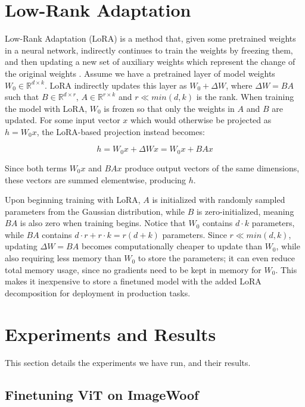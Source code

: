 \documentclass[10pt]{article}
\begin{document}
\section{Low-Rank Adaptation}
\label{sec:lora}

Low-Rank Adaptation (LoRA) is a method that, given some pretrained weights in a neural network, indirectly continues to train the weights by freezing them, and then updating a new set of auxiliary weights which represent the change of the original weights \cite{hu2021loralowrankadaptationlarge}. Assume we have a pretrained layer of model weights $W_0 \in \mathbb{R}^{d \times k}$. LoRA indirectly updates this layer as $W_0 + \Delta W$, where $\Delta W = BA$ such that $B \in \mathbb{R}^{d \times r}$, $A \in \mathbb{R}^{r \times k}$ and $r \ll min(d, k)$ is the rank. When training the model with LoRA, $W_0$ is frozen so that only the weights in $A$ and $B$ are updated. For some input vector $x$ which would otherwise be projected as $h = W_0x$, the LoRA-based projection instead becomes:

\begin{equation}
    h = W_0x + \Delta Wx = W_0x + BAx
\end{equation}

Since both terms $W_0x$ and $BAx$ produce output vectors of the same dimensions, these vectors are summed elementwise, producing $h$.

Upon beginning training with LoRA, $A$ is initialized with randomly sampled parameters from the Gaussian distribution, while $B$ is zero-initialized, meaning $BA$ is also zero when training begins. Notice that $W_0$ contains $d \cdot k$ parameters, while $BA$ contains $d \cdot r + r \cdot k = r(d + k)$ parameters. Since $r \ll min(d, k)$, updating $\Delta W = BA$ becomes computationally cheaper to update than $W_0$, while also requiring less memory than $W_0$ to store the parameters; it can even reduce total memory usage, since no gradients need to be kept in memory for $W_0$. This makes it inexpensive to store a finetuned model with the added LoRA decomposition for deployment in production tasks.

\section{Experiments and Results}
This section details the experiments we have run, and their results.

\subsection{Finetuning ViT on ImageWoof}
\label{subsec:finetuning_vit_imagewoof}
\end{document}
